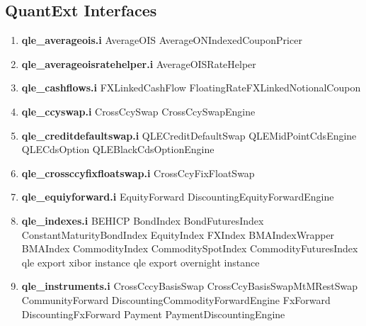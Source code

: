\documentclass[10pt]{article}
\begin{document}
\subsection*{QuantExt Interfaces}
\begin{multicols}{2}
    \begin{enumerate}
        \item \textbf{qle\_averageois.i}
                \subitem AverageOIS
                \subitem AverageONIndexedCouponPricer
        \item \textbf{qle\_averageoisratehelper.i}
                \subitem AverageOISRateHelper
        \item \textbf{qle\_cashflows.i}
                \subitem FXLinkedCashFlow
                \subitem FloatingRateFXLinkedNotionalCoupon
        \item \textbf{qle\_ccyswap.i}
                \subitem CrossCcySwap
                \subitem CrossCcySwapEngine
        \item \textbf{qle\_creditdefaultswap.i}
                \subitem QLECreditDefaultSwap
                \subitem QLEMidPointCdsEngine
                \subitem QLECdsOption
                \subitem QLEBlackCdsOptionEngine
        \item \textbf{qle\_crossccyfixfloatswap.i}
                \subitem CrossCcyFixFloatSwap
        \item \textbf{qle\_equiyforward.i}
                \subitem EquityForward
                \subitem DiscountingEquityForwardEngine
        \item \textbf{qle\_indexes.i}
                \subitem BEHICP
                \subitem BondIndex
                \subitem BondFuturesIndex
                \subitem ConstantMaturityBondIndex
                \subitem EquityIndex
                \subitem FXIndex
                \subitem BMAIndexWrapper
                \subitem BMAIndex
                \subitem CommodityIndex
                \subitem CommoditySpotIndex
                \subitem CommodityFuturesIndex
                \subitem qle export xibor instance
                \subitem qle export overnight instance
        \item \textbf{qle\_instruments.i}
                \subitem CrossCccyBasisSwap
                \subitem CrossCcyBasisSwapMtMRestSwap
                \subitem CommunityForward
                \subitem DiscountingCommodityForwardEngine
                \subitem FxForward
                \subitem DiscountingFxForward
                \subitem Payment
                \subitem PaymentDiscountingEngine

\end{enumerate}
\end{multicols}
\end{document}
